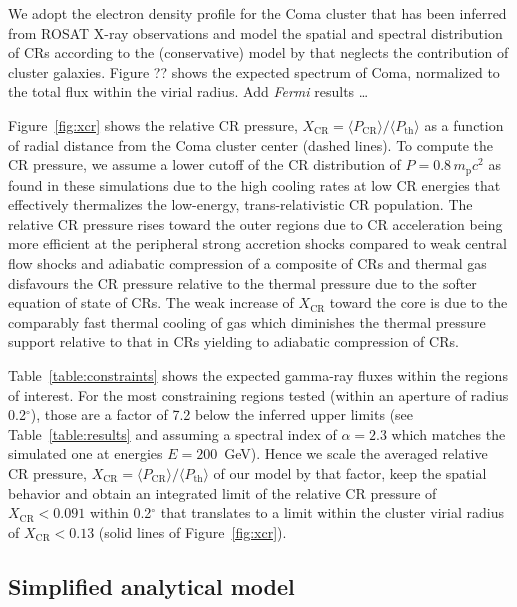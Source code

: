 \documentclass[12pt,manuscript]{aastex}
\newcommand{\rmn}{\mathrm}
\newcommand{\CR}{\mathrm{CR}}
\newcommand{\bra}{\langle}
\newcommand{\ket}{\rangle}
\begin{document}
We adopt the electron density profile for the Coma cluster that has been
inferred from ROSAT X-ray observations \citep{1992A&A...259L..31B} and model the
spatial and spectral distribution of CRs according to the (conservative) model
by \citet{2010MNRAS.409..449P} that neglects the contribution of cluster
galaxies. Figure ?? shows the expected spectrum of Coma, normalized to the total
flux within the virial radius. Add {\em Fermi} results \ldots

Figure~\ref{fig:xcr} shows the relative CR pressure, $X_\CR = \bra P_\CR
\ket / \bra P_\rmn{th} \ket$ as a function of radial distance from the
Coma cluster center (dashed lines). To compute the CR pressure, we assume a
lower cutoff of the CR distribution of $P = 0.8\,m_\rmn{p} c^2$ as found in
these simulations due to the high cooling rates at low CR energies that
effectively thermalizes the low-energy, trans-relativistic CR population.  The
relative CR pressure rises toward the outer regions due to CR acceleration being
more efficient at the peripheral strong accretion shocks compared to weak
central flow shocks and adiabatic compression of a composite of CRs and thermal
gas disfavours the CR pressure relative to the thermal pressure due to the
softer equation of state of CRs. The weak increase of $X_\CR$ toward the core is
due to the comparably fast thermal cooling of gas which diminishes the thermal
pressure support relative to that in CRs yielding to adiabatic compression of
CRs.

Table~\ref{table:constraints} shows the expected gamma-ray fluxes within the
regions of interest. For the most constraining regions tested (within an
aperture of radius 0.2$^\circ$), those are a factor of 7.2 below the inferred
upper limits (see Table~\ref{table:results} and assuming a spectral index of
$\alpha=2.3$ which matches the simulated one at energies $E=200$~GeV).  Hence we
scale the averaged relative CR pressure, $X_\CR = \bra P_\CR \ket /
\bra P_\rmn{th} \ket$ of our model by that factor, keep the spatial
behavior and obtain an integrated limit of the relative CR pressure of
$X_\CR<0.091$ within 0.2$^\circ$ that translates to a limit within the cluster
virial radius of $X_\CR<0.13$ (solid lines of Figure~\ref{fig:xcr}).



\subsection{Simplified analytical model}
\end{document}
